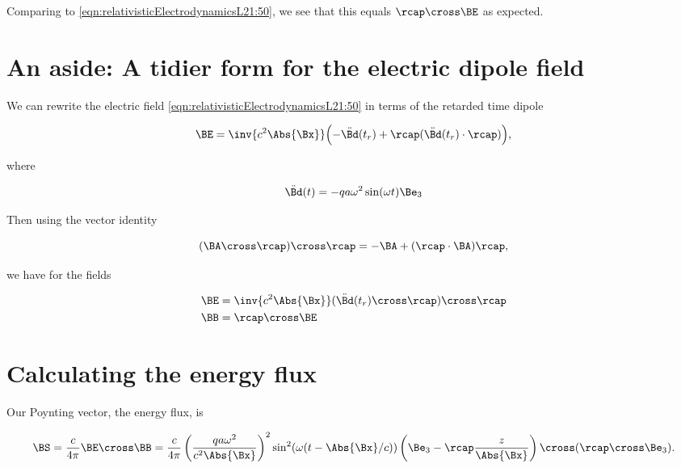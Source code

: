 Comparing to \ref{eqn:relativisticElectrodynamicsL21:50}, we see that this equals $\rcap \cross \BE$ as expected.

\section{An aside: A tidier form for the electric dipole field}

We can rewrite the electric field \ref{eqn:relativisticElectrodynamicsL21:50} in terms of the retarded time dipole

\begin{equation}\label{eqn:relativisticElectrodynamicsL21:80}
\BE = \inv{c^2 \Abs{\Bx}} \Bigl( -\ddot{\Bd}(t_r) + \rcap ( \ddot{\Bd}(t_r) \cdot \rcap ) \Bigr),
\end{equation}

where

\begin{equation}\label{eqn:relativisticElectrodynamicsL21:100}
\ddot{\Bd}(t) = - q a \omega^2 \sin(\omega t) \Be_3
\end{equation}

Then using the vector identity

\begin{equation}\label{eqn:relativisticElectrodynamicsL21:120}
(\BA \cross \rcap ) \cross \rcap = -\BA + (\rcap \cdot \BA) \rcap,
\end{equation}

we have for the fields

\begin{align}\label{eqn:relativisticElectrodynamicsL21:140}
\BE &= \inv{c^2 \Abs{\Bx}} (\ddot{\Bd}(t_r) \cross \rcap) \cross \rcap \\
\BB &= \rcap \cross \BE
\end{align}

\section{Calculating the energy flux}

Our Poynting vector, the energy flux, is

\begin{equation}\label{eqn:relativisticElectrodynamicsL21:160}
\BS = \frac{c}{4 \pi} \BE \cross \BB =
\frac{c}{4 \pi}
\left( \frac{q a \omega^2}{c^2 \Abs{\Bx} } \right)^2
\sin^2(\omega (t - \Abs{\Bx}/c))
\left( \Be_3 - \rcap \frac{z}{\Abs{\Bx}} \right) \cross (\rcap \cross \Be_3).
\end{equation}

